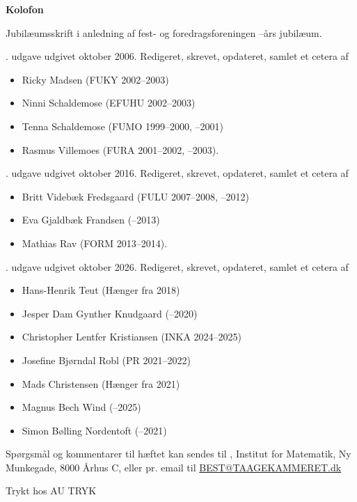 \mbox{}
\vfill

\begin{center}
\textbf{Kolofon}
\end{center}

\noindent
Jubilæumsskrift i anledning af fest- og foredragsforeningen --års jubilæum.

\vspace{1em}

. udgave udgivet oktober 2006. Redigeret, skrevet, opdateret, samlet et cetera af

\begin{itemize}
	\item[--] Ricky Madsen (FUKY 2002--2003)
	\item[--] Ninni Schaldemose (EFUHU 2002--2003)
	\item[--] Tenna Schaldemose (FUMO 1999--2000, --2001)
	\item[--] Rasmus Villemoes (FURA 2001--2002, --2003).
\end{itemize}

. udgave  udgivet oktober 2016. Redigeret, skrevet, opdateret, samlet et cetera af

\begin{itemize}
	\item[--] Britt Videbæk Fredsgaard (FULU 2007–2008, –2012)
	\item[--] Eva Gjaldbæk Frandsen (–2013)
	\item[--] Mathias Rav (FORM 2013–2014).
\end{itemize}

. udgave  udgivet oktober 2026. Redigeret, skrevet, opdateret, samlet et cetera af

\begin{itemize}
	\item[--] Hans-Henrik Teut (Hænger fra 2018)
	\item[--] Jesper Dam Gynther Knudgaard (--2020)
	\item[--] Christopher Lentfer Kristiansen (INKA 2024--2025)
	\item[--] Josefine Bjørndal Robl (PR 2021--2022)
	\item[--] Mads Christensen (Hænger fra 2021)
	\item[--] Magnus Bech Wind (--2025)
	\item[--] Simon Bølling Nordentoft (--2021)
\end{itemize}
Spørgsmål og kommentarer til hæftet kan sendes til \TKET{}, Institut for Matematik, Ny Munkegade, 8000 Århus C, eller pr. email til \href{mailto:BEST@TAAGEKAMMERET.dk}{BEST@TAAGEKAMMERET.dk}

\begin{center}
	Trykt hos AU TRYK
\end{center}

